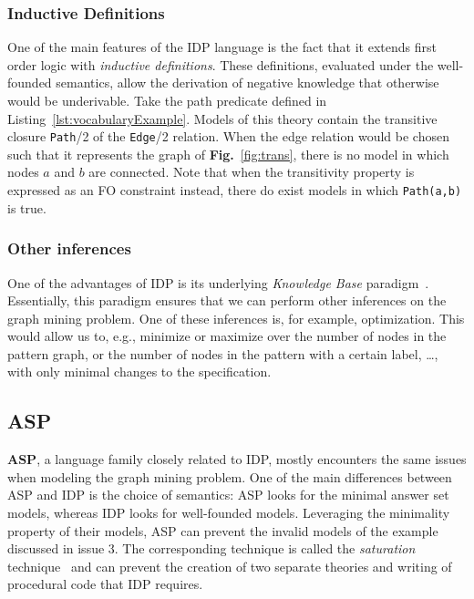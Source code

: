 \subsubsection{Inductive Definitions}
One of the main features of the IDP language is the fact that it extends first order logic with \emph{inductive definitions}. These definitions, evaluated under the well-founded semantics, allow the derivation of negative knowledge that otherwise would be underivable.
Take the path predicate defined in Listing~\ref{lst:vocabularyExample}.
Models of this theory contain the transitive closure \lstinline|Path|/2 of the \lstinline|Edge|/2 relation.
When the edge relation would be chosen such that it represents the graph of \textbf{Fig.}~\ref{fig:trans}, there is no model in which nodes $a$ and $b$ are connected. Note that when the transitivity property is expressed as an FO constraint instead, there do exist models in which \lstinline|Path(a,b)| is true.


\subsubsection{Other inferences}
One of the advantages of IDP is its underlying \emph{Knowledge Base} paradigm~\citep{WarrenBook/DeCatBBD16}.
Essentially, this paradigm ensures that we can perform other inferences on the graph mining problem.
One of these inferences is, for example, optimization.
This would allow us to, e.g., minimize or maximize over the number of nodes in the pattern graph, or the number of nodes in the pattern with a certain label, \ldots, with only minimal changes to the specification.

\reversemarginpar

\subsection{ASP}
\textbf{ASP}, a language family closely related to IDP, mostly encounters the same issues when modeling the graph mining problem.
One of the main differences between ASP and IDP is the choice of semantics: ASP looks for the minimal answer set models, whereas IDP looks for well-founded models.
Leveraging the minimality property of their models, ASP can prevent the invalid models of the example discussed in issue 3.
The corresponding technique is called the \emph{saturation} technique~\citep{conf/rweb/EiterIK09} and can prevent the creation of two separate theories and writing of procedural code that IDP requires.

